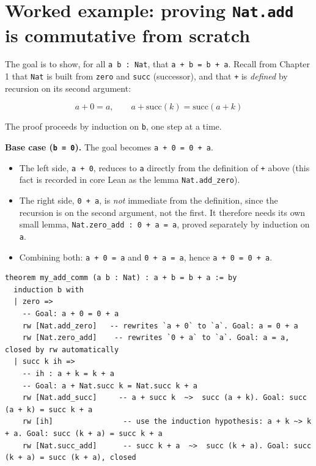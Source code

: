 \section{\texorpdfstring{Worked example: proving \texttt{Nat.add} is commutative from scratch}{Worked example: proving Nat.add is commutative from scratch}}\label{sec:04-tactics:05-worked-example:1}

The goal is to show, for all \texttt{a b : Nat}, that \texttt{a + b = b + a}. Recall from Chapter 1 that \texttt{Nat} is built from \texttt{zero} and \texttt{succ} (successor), and that \texttt{+} is \emph{defined} by recursion on its second argument:

\[
a + 0 = a, \qquad a + \mathrm{succ}(k) = \mathrm{succ}(a + k)
\]

The proof proceeds by induction on \texttt{b}, one step at a time.

\textbf{Base case (\texttt{b = 0}).} The goal becomes \texttt{a + 0 = 0 + a}.

\begin{itemize}
\tightlist
\item
  The left side, \texttt{a + 0}, reduces to \texttt{a} directly from the definition of \texttt{+} above (this fact is recorded in core Lean as the lemma \texttt{Nat.add\_\allowbreak{}zero}).
\item
  The right side, \texttt{0 + a}, is \emph{not} immediate from the definition, since the recursion is on the second argument, not the first. It therefore needs its own small lemma, \texttt{Nat.zero\_\allowbreak{}add : 0 + a = a}, proved separately by induction on \texttt{a}.
\item
  Combining both: \texttt{a + 0 = a} and \texttt{0 + a = a}, hence \texttt{a + 0 = 0 + a}.
\end{itemize}

\begin{lstlisting}
theorem my_add_comm (a b : Nat) : a + b = b + a := by
  induction b with
  | zero =>
    -- Goal: a + 0 = 0 + a
    rw [Nat.add_zero]   -- rewrites `a + 0` to `a`. Goal: a = 0 + a
    rw [Nat.zero_add]    -- rewrites `0 + a` to `a`. Goal: a = a, closed by rw automatically
  | succ k ih =>
    -- ih : a + k = k + a
    -- Goal: a + Nat.succ k = Nat.succ k + a
    rw [Nat.add_succ]     -- a + succ k  ~>  succ (a + k). Goal: succ (a + k) = succ k + a
    rw [ih]                -- use the induction hypothesis: a + k ~> k + a. Goal: succ (k + a) = succ k + a
    rw [Nat.succ_add]      -- succ k + a  ~>  succ (k + a). Goal: succ (k + a) = succ (k + a), closed
\end{lstlisting}

